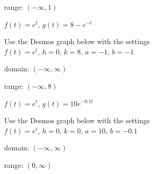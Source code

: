 \documentclass{ximera}
\begin{document}
\begin{question}
\begin{problem}
\begin{solution}
range: $(-\infty,1)$

\end{solution}
\end{problem}

\begin{problem}
$f(t) = e^{t}$, $g(t) = 8 - e^{-t}$

\begin{solution}
Use the Desmos graph below with the settings $f(t)=e^t,\,h=0,\,k=8,\,a=-1,\,b=-1$

\begin{center} 
\end{center}

domain: $(-\infty, \infty)$

range: $(-\infty,8)$

\end{solution}
\end{problem}  

\begin{problem}\label{graphexplasta}
$f(t) = e^{t}$, $g(t) = 10e^{-0.1t}$   

\begin{solution}
Use the Desmos graph below with the settings $f(t)=e^t,\,h=0,\,k=0,\,a=10,\,b=-0.1$

\begin{center} 
\end{center}

domain: $(-\infty, \infty)$

range: $(0,\infty)$

\end{solution}
\end{problem}   

\end{question}
\end{document}
